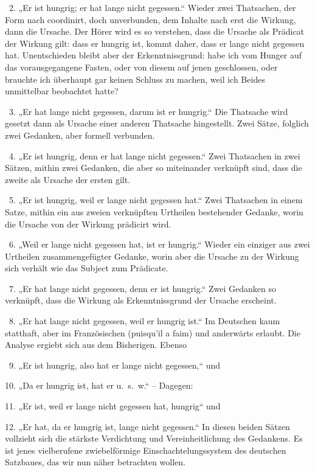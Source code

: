 ~2. „Er ist hungrig; er hat lange nicht gegessen.“ Wieder zwei Thatsachen, der Form nach coordinirt, doch unverbunden, dem Inhalte nach erst die Wirkung, dann die Ursache. Der Hörer wird es so verstehen, dass die Ursache als Prädicat der Wirkung gilt: dass er hungrig ist, kommt daher, dass er lange nicht gegessen hat. Unentschieden bleibt aber der Erkenntnissgrund: habe ich vom Hunger auf das vorausge\label{fp.428}gangene Fasten, oder von diesem auf jenen geschlossen, oder brauchte ich überhaupt gar keinen Schluss zu machen, weil ich Beides unmittelbar beobachtet hatte?

~3. „Er hat lange nicht gegessen, darum ist er hungrig.“ Die Thatsache wird gesetzt dann als Ursache einer anderen Thatsache hingestellt. Zwei Sätze, folglich zwei Gedanken, aber formell verbunden.

~4. „Er ist hungrig, denn er hat lange nicht gegessen.“ Zwei Thatsachen in zwei Sätzen, mithin zwei Gedanken, die aber so miteinander verknüpft sind, dass die zweite als Ursache der ersten gilt.

~5. „Er ist hungrig, weil er lange nicht gegessen hat.“ Zwei Thatsachen in einem Satze, mithin ein aus zweien verknüpften Urtheilen bestehender Gedanke, worin die Ursache von der Wirkung prädicirt wird.

\label{sp.449}


\largerpage[-2]
~6. „Weil er lange nicht gegessen hat, ist er hungrig.“ Wieder ein einziger aus zwei Urtheilen zusammengefügter Gedanke, worin aber die Ursache zu der Wirkung sich verhält wie das Subject zum Prädicate.

~7. „Er hat lange nicht gegessen, denn er ist hungrig.“ Zwei Gedanken so verknüpft, dass die Wirkung als Erkenntnissgrund der Ursache erscheint.

~8. „Er hat lange nicht gegessen, weil er hungrig ist.“ Im Deutschen kaum statthaft, aber im Französischen (puisqu’il a faim) und anderwärts erlaubt. Die Analyse ergiebt sich aus dem Bisherigen. Ebenso

~9. „Er ist hungrig, also hat er lange nicht gegessen,“ und

10. „Da er hungrig ist, hat er u.~s.~w.“ – Dagegen:

11. „Er ist, weil er lange nicht gegessen hat, hungrig“ und

12. „Er hat, da er hungrig ist, lange nicht gegessen.“ In diesen beiden Sätzen vollzieht sich die stärkste Verdichtung und Vereinheitlichung des Gedankens. Es ist jenes vielberufene zwiebelförmige Einschachtelungssystem des deutschen Satzbaues, das wir nun näher betrachten wollen.

